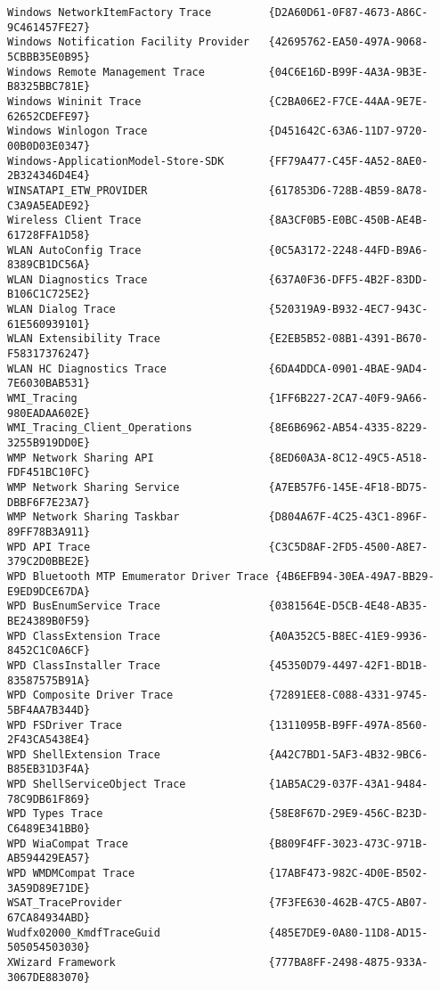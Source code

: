 \documentclass{report}
\begin{document}
\begin{lstlisting}[breaklines=true,basicstyle=\tiny]
Windows NetworkItemFactory Trace         {D2A60D61-0F87-4673-A86C-9C461457FE27}
Windows Notification Facility Provider   {42695762-EA50-497A-9068-5CBBB35E0B95}
Windows Remote Management Trace          {04C6E16D-B99F-4A3A-9B3E-B8325BBC781E}
Windows Wininit Trace                    {C2BA06E2-F7CE-44AA-9E7E-62652CDEFE97}
Windows Winlogon Trace                   {D451642C-63A6-11D7-9720-00B0D03E0347}
Windows-ApplicationModel-Store-SDK       {FF79A477-C45F-4A52-8AE0-2B324346D4E4}
WINSATAPI_ETW_PROVIDER                   {617853D6-728B-4B59-8A78-C3A9A5EADE92}
Wireless Client Trace                    {8A3CF0B5-E0BC-450B-AE4B-61728FFA1D58}
WLAN AutoConfig Trace                    {0C5A3172-2248-44FD-B9A6-8389CB1DC56A}
WLAN Diagnostics Trace                   {637A0F36-DFF5-4B2F-83DD-B106C1C725E2}
WLAN Dialog Trace                        {520319A9-B932-4EC7-943C-61E560939101}
WLAN Extensibility Trace                 {E2EB5B52-08B1-4391-B670-F58317376247}
WLAN HC Diagnostics Trace                {6DA4DDCA-0901-4BAE-9AD4-7E6030BAB531}
WMI_Tracing                              {1FF6B227-2CA7-40F9-9A66-980EADAA602E}
WMI_Tracing_Client_Operations            {8E6B6962-AB54-4335-8229-3255B919DD0E}
WMP Network Sharing API                  {8ED60A3A-8C12-49C5-A518-FDF451BC10FC}
WMP Network Sharing Service              {A7EB57F6-145E-4F18-BD75-DBBF6F7E23A7}
WMP Network Sharing Taskbar              {D804A67F-4C25-43C1-896F-89FF78B3A911}
WPD API Trace                            {C3C5D8AF-2FD5-4500-A8E7-379C2D0BBE2E}
WPD Bluetooth MTP Emumerator Driver Trace {4B6EFB94-30EA-49A7-BB29-E9ED9DCE67DA}
WPD BusEnumService Trace                 {0381564E-D5CB-4E48-AB35-BE24389B0F59}
WPD ClassExtension Trace                 {A0A352C5-B8EC-41E9-9936-8452C1C0A6CF}
WPD ClassInstaller Trace                 {45350D79-4497-42F1-BD1B-83587575B91A}
WPD Composite Driver Trace               {72891EE8-C088-4331-9745-5BF4AA7B344D}
WPD FSDriver Trace                       {1311095B-B9FF-497A-8560-2F43CA5438E4}
WPD ShellExtension Trace                 {A42C7BD1-5AF3-4B32-9BC6-B85EB31D3F4A}
WPD ShellServiceObject Trace             {1AB5AC29-037F-43A1-9484-78C9DB61F869}
WPD Types Trace                          {58E8F67D-29E9-456C-B23D-C6489E341BB0}
WPD WiaCompat Trace                      {B809F4FF-3023-473C-971B-AB594429EA57}
WPD WMDMCompat Trace                     {17ABF473-982C-4D0E-B502-3A59D89E71DE}
WSAT_TraceProvider                       {7F3FE630-462B-47C5-AB07-67CA84934ABD}
Wudfx02000_KmdfTraceGuid                 {485E7DE9-0A80-11D8-AD15-505054503030}
XWizard Framework                        {777BA8FF-2498-4875-933A-3067DE883070}
\end{lstlisting}
\end{document}
